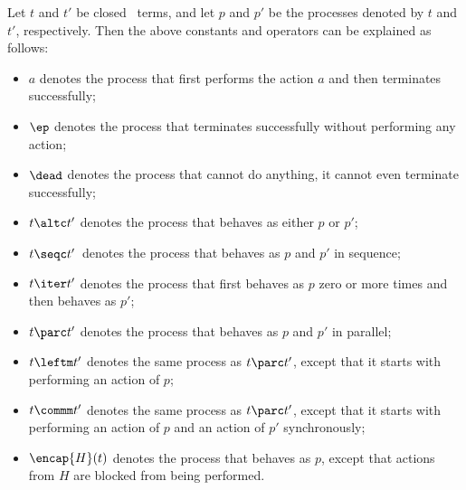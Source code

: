\documentclass[runningheads]{llncs}
\begin{document}
Let $t$ and $t'$ be closed \ACPei\ terms, and let $p$ and $p'$ be the 
processes denoted by $t$ and $t'$, respectively. 
%
Then the above constants and operators can be explained as follows:
\begin{itemize}
\item
$a$ denotes the process that first performs the action $a$ and then 
terminates successfully;
\item
$\ep$ denotes the process that terminates successfully without 
performing any action;
\item
$\dead$ denotes the process that cannot do anything, it cannot even 
terminate successfully;
\item
$t \altc t'$ denotes the process that behaves as either $p$ or $p'$;
\item
$t \seqc t'$\, denotes the process that behaves as $p$ and $p'$ in 
sequence;
\item
$t \iter t'$ denotes the process that first behaves as $p$ zero or more 
times and then behaves as $p'$;
\item
$t \parc t'$ denotes the process that behaves as $p$ and $p'$ in 
parallel;
\item
$t \leftm t'$ denotes the same process as $t \parc t'$, except that it 
starts with performing an action of $p$;
\item
$t \commm t'$ denotes the same process as $t \parc t'$, except that it 
starts with performing an action of $p$ and an action of $p'$ 
synchronously;
\item
$\encap{H}(t)$ denotes the process that behaves as $p$, except that 
actions from $H$ are blocked from being performed.
\end{itemize}
\end{document}
